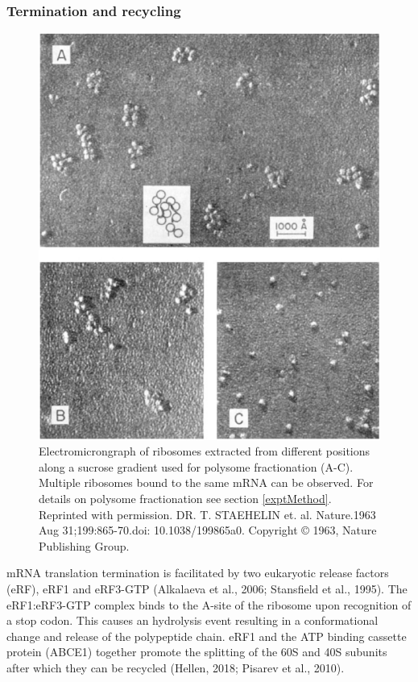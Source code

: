 \documentclass[
  12pt,
  openany]{book}
\begin{document}
\subsubsection{Termination and recycling} 
\begin{figure}
  \includegraphics{./figures/polysome.pdf}
  \caption{Electromicrongraph of ribosomes extracted from different positions along a sucrose gradient used for polysome fractionation (A-C). Multiple ribosomes bound to the same mRNA can be observed. For details on polysome fractionation see section \ref{exptMethod}. Reprinted with permission. DR. T. STAEHELIN et. al. Nature.1963 Aug 31;199:865-70.doi: 10.1038/199865a0. Copyright © 1963, Nature Publishing Group.
 \label{fig:polysomes}}
\end{figure}

mRNA translation termination is facilitated by two eukaryotic release factors (eRF), eRF1 and eRF3-GTP (Alkalaeva et al., 2006; Stansfield et al., 1995). The eRF1:eRF3-GTP complex binds to the A-site of the ribosome upon recognition of a stop codon. This causes an hydrolysis event resulting in a conformational change and release of the polypeptide chain. eRF1 and the ATP binding cassette protein (ABCE1) together promote the splitting of the 60S and 40S subunits after which they can be recycled (Hellen, 2018; Pisarev et al., 2010).
\end{document}
